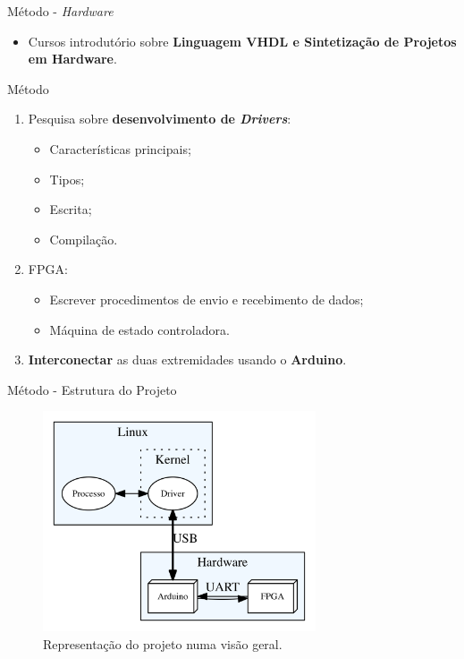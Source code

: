 	\begin{frame}{Método - \textit{Hardware}}
		\begin{itemize}
			\setlength\itemsep{2.2em}
			\item Cursos introdutório sobre \textbf{Linguagem VHDL e Sintetização de Projetos em Hardware}.
		\end{itemize}
	\end{frame}
	\begin{frame}{Método}
		\begin{enumerate}
			\setlength\itemsep{1.2em}
			\item Pesquisa sobre \textbf{desenvolvimento de \textit{Drivers}}:
			\begin{itemize}
				\item Características principais;
				\item Tipos;
				\item Escrita;
				\item Compilação.
			\end{itemize}
			\item FPGA:
			\begin{itemize}
				\item Escrever procedimentos de envio e recebimento de dados;
				\item Máquina de estado controladora.
			\end{itemize}
			\item \textbf{Interconectar} as duas extremidades usando o \textbf{Arduino}.
		\end{enumerate}
	\end{frame}
	\begin{frame}{Método - Estrutura do Projeto}
		\begin{figure}[p]
			\centering
			\includegraphics[width=0.72\textwidth]{img/projeto.png}
			\caption{Representação do projeto numa visão geral.}
			\label{fig:projeto}
		\end{figure}
	\end{frame}









